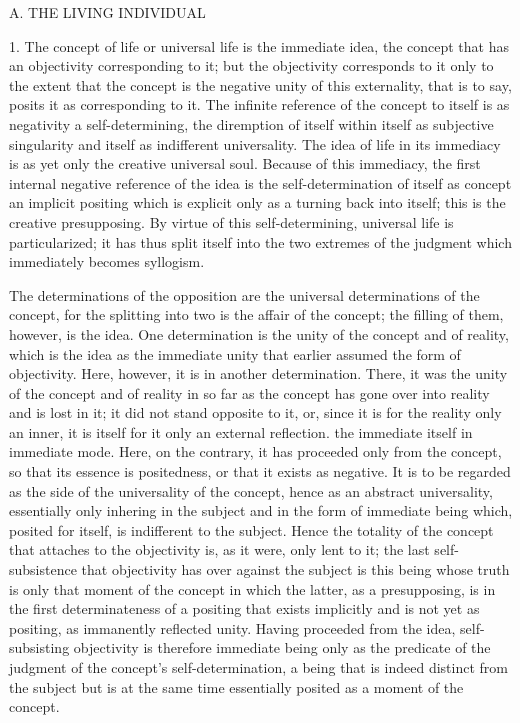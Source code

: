 A. THE LIVING INDIVIDUAL

1. The concept of life or universal life is the immediate idea,
the concept that has an objectivity corresponding to it;
but the objectivity corresponds to it only to the extent
that the concept is the negative unity of this externality,
that is to say, posits it as corresponding to it.
The infinite reference of the concept to itself is
as negativity a self-determining,
the diremption of itself within itself
as subjective singularity
and itself as indifferent universality.
The idea of life in its immediacy is as yet
only the creative universal soul.
Because of this immediacy,
the first internal negative reference of the idea
is the self-determination of itself as concept
an implicit positing which is explicit only
as a turning back into itself;
this is the creative presupposing.
By virtue of this self-determining,
universal life is particularized;
it has thus split itself into
the two extremes of the judgment
which immediately becomes syllogism.

The determinations of the opposition are
the universal determinations of the concept,
for the splitting into two is
the affair of the concept;
the filling of them, however, is the idea.
One determination is the unity of
the concept and of reality,
which is the idea as the immediate unity
that earlier assumed the form of objectivity.
Here, however, it is in another determination.
There, it was the unity of the concept and of reality
in so far as the concept has gone over into reality
and is lost in it;
it did not stand opposite to it, or,
since it is for the reality only an inner,
it is itself for it only an external reflection.
the immediate itself in immediate mode.
Here, on the contrary, it has proceeded
only from the concept,
so that its essence is positedness,
or that it exists as negative.
It is to be regarded as the side of
the universality of the concept,
hence as an abstract universality,
essentially only inhering in the subject
and in the form of immediate being
which, posited for itself, is
indifferent to the subject.
Hence the totality of the concept
that attaches to the objectivity is,
as it were, only lent to it;
the last self-subsistence that
objectivity has over against the subject
is this being whose truth is only
that moment of the concept
in which the latter, as a presupposing,
is in the first determinateness of
a positing that exists implicitly
and is not yet as positing,
as immanently reflected unity.
Having proceeded from the idea,
self-subsisting objectivity is
therefore immediate being only as
the predicate of the judgment of
the concept's self-determination,
a being that is indeed distinct from the subject
but is at the same time essentially posited as
a moment of the concept.


